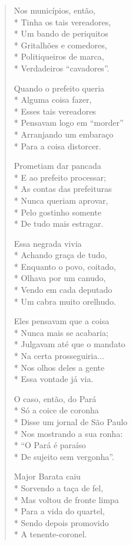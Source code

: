 \begin{verse}
Nos municípios, então,\\*
Tinha os tais vereadores,\\*
Um bando de periquitos\\*
Gritalhões e comedores,\\*
Politiqueiros de marca,\\*
Verdadeiros “cavadores”.

Quando o prefeito queria\\*
Alguma coisa fazer,\\*
Esses tais vereadores\\*
Pensavam logo em “morder”\\*
Arranjando um embaraço\\*
Para a coisa distorcer.

Prometiam dar pancada\\*
E ao prefeito processar;\\*
As contas das prefeituras\\*
Nunca queriam aprovar,\\*
Pelo gostinho somente\\*
De tudo mais estragar.

Essa negrada vivia\\*
Achando graça de tudo,\\*
Enquanto o povo, coitado,\\*
Olhava por um canudo,\\*
Vendo em cada deputado\\*
Um cabra muito orelhudo.

Eles pensavam que a coisa\\*
Nunca mais se acabaria;\\*
Julgavam até que o mandato\\*
Na certa prosseguiria...\\*
Nos olhos deles a gente\\*
Essa vontade já via.

O caso, então, do Pará\\*
Só a coice de coronha\\*
Disse um jornal de São Paulo\\*
Nos mostrando a sua ronha:\\*
“O Pará é paraíso\\*
De sujeito sem vergonha”.

Major Barata caiu\\*
Sorvendo a taça de fel,\\*
Mas voltou de fronte limpa\\*
Para a vida do quartel,\\*
Sendo depois promovido\\*
A tenente-coronel.


\end{verse}
